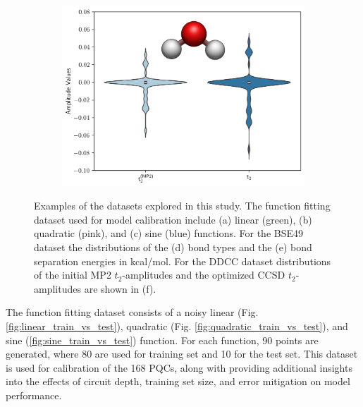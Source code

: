 \documentclass[journal=jacsat,manuscript=article]{achemso}
\begin{document}
\begin{figure}[H]
\begin{subfigure}[b]{0.3\textwidth}
		\caption{}
		\label{fig:BSEdistr}
	\end{subfigure}
	\hfill
	\begin{subfigure}[b]{0.3\textwidth}
		\centering
		\includegraphics[width=\textwidth]{../images/manuscript_figures/waterddccdistribution.png}
		\caption{}
		\label{fig:waterddccdistribution}
	\end{subfigure}	
	\caption{Examples of the datasets explored in this study. The function fitting dataset used for model calibration include (a) linear (green), (b) quadratic (pink), and (c) sine (blue) functions. For the BSE49 dataset the distributions of the (d) bond types and the (e) bond separation energies in kcal/mol. For the DDCC dataset distributions of the initial MP2 $t_{2}$-amplitudes and the optimized CCSD $t_{2}$-amplitudes are shown in (f).}
	\label{fig:bse_data}
\end{figure}


The function fitting dataset consists of a noisy linear (Fig. \ref{fig:linear_train_vs_test}), quadratic (Fig. \ref{fig:quadratic_train_vs_test}), and sine (\ref{fig:sine_train_vs_test}) function.  
For each function, 90 points are generated, where 80 are used for training set and 10 for the test set.
This dataset is used for calibration of the 168 PQCs, along with providing additional insights into the effects of circuit depth, training set size, and error mitigation on model performance.
\end{document}
